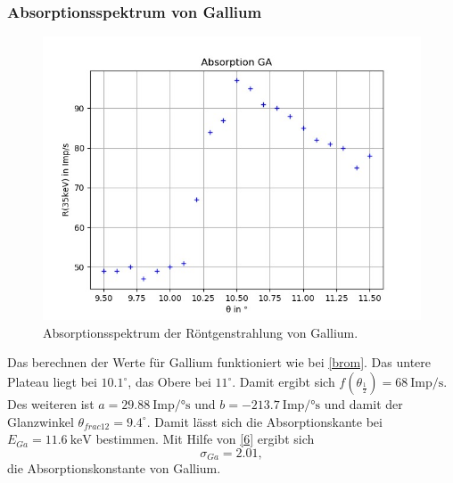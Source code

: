 \subsubsection*{Absorptionsspektrum von Gallium}
\begin{figure}[H]
  \centering
  \includegraphics{content/Ga.png}
  \caption{Absorptionsspektrum der Röntgenstrahlung von Gallium.}
  \label{fig:ga}
\end{figure}
Das berechnen der Werte für Gallium funktioniert wie bei \autoref{brom}. Das untere Plateau liegt bei $10.1^\circ$, das Obere bei $11^\circ$. Damit ergibt sich $f(\theta_{\frac{1}{2}})=68\ \textrm{Imp/s}$. Des weiteren ist $a=29.88\ \textrm{Imp/°s}$ und $b=-213.7\ \textrm{Imp/°s}$ und damit der Glanzwinkel $\theta_{frac{1}{2}}=9.4^\circ$. Damit lässt sich die Absorptionskante bei $E_{Ga}=11.6\ \textrm{keV}$ bestimmen. Mit Hilfe von \eqref{6} ergibt sich 
\begin{equation*}
  \sigma_{Ga}=2.01,
\end{equation*}
die Absorptionskonstante von Gallium.

